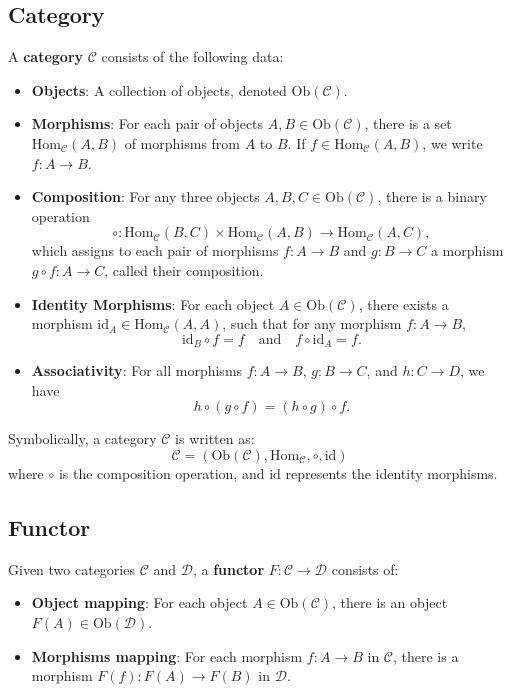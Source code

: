 \newpage
\subsection*{Category}
A \textbf{category} \( \mathcal{C} \) consists of the following data:

\begin{itemize}
	\item \textbf{Objects}: A collection of objects, denoted \( \text{Ob}(\mathcal{C}) \).
	\item \textbf{Morphisms}: For each pair of objects \( A, B \in \text{Ob}(\mathcal{C}) \), there is a set \( \text{Hom}_{\mathcal{C}}(A, B) \) of morphisms from \( A \) to \( B \). If \( f \in \text{Hom}_{\mathcal{C}}(A, B) \), we write \( f: A \to B \).
	\item \textbf{Composition}: For any three objects \( A, B, C \in \text{Ob}(\mathcal{C}) \), there is a binary operation
	\[
	\circ: \text{Hom}_{\mathcal{C}}(B, C) \times \text{Hom}_{\mathcal{C}}(A, B) \to \text{Hom}_{\mathcal{C}}(A, C),
	\]
	which assigns to each pair of morphisms \( f: A \to B \) and \( g: B \to C \) a morphism \( g \circ f: A \to C \), called their composition.
	\item \textbf{Identity Morphisms}: For each object \( A \in \text{Ob}(\mathcal{C}) \), there exists a morphism \( \text{id}_A \in \text{Hom}_{\mathcal{C}}(A, A) \), such that for any morphism \( f: A \to B \),
	\[
	\text{id}_B \circ f = f \quad \text{and} \quad f \circ \text{id}_A = f.
	\]
	\item \textbf{Associativity}: For all morphisms \( f: A \to B \), \( g: B \to C \), and \( h: C \to D \), we have
	\[
	h \circ (g \circ f) = (h \circ g) \circ f.
	\]
\end{itemize}

Symbolically, a category \( \mathcal{C} \) is written as:
\[
\mathcal{C} = \left( \text{Ob}(\mathcal{C}), \text{Hom}_{\mathcal{C}}, \circ, \text{id} \right)
\]
where \( \circ \) is the composition operation, and \( \text{id} \) represents the identity morphisms.
\newpage
\subsection*{Functor}
Given two categories \( \mathcal{C} \) and \( \mathcal{D} \), a \textbf{functor} \( F: \mathcal{C} \to \mathcal{D} \) consists of:

\begin{itemize}
	\item \textbf{Object mapping}: For each object \( A \in \text{Ob}(\mathcal{C}) \), there is an object \( F(A) \in \text{Ob}(\mathcal{D}) \).
	\item \textbf{Morphisms mapping}: For each morphism \( f: A \to B \) in \( \mathcal{C} \), there is a morphism \( F(f): F(A) \to F(B) \) in \( \mathcal{D} \).
\end{itemize}

